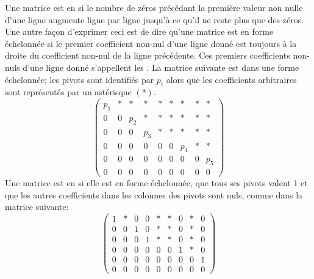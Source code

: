 Une matrice est en   si le nombre de zéros précédant la première valeur 
non nulle d'une ligne augmente ligne par ligne jusqu'à ce qu'il ne reste plus que des zéros. 
Une autre façon d'exprimer ceci est de dire qu'une matrice est en forme échelonnée si
le premier coefficient non-nul d'une ligne donné est toujours à 	la droite du coefficient non-nul de la ligne précédente.
Ces premiers coefficients non-nuls d'une ligne donné s'appellent les .
La matrice suivante est dans une forme échelonnée; les pivots sont identifiés par $p_i$ alors
que les coefficients arbitraires sont représentés par un astérisque $(*)$.
\[
\begin{pmatrix}
p_1 & *  & * & * & * & * & * & * & * \\
0 & 0 & p_2 & * & * & * & * & * & * \\
0 & 0 & 0 & p_3 & * & * & * & * & * \\ 
0 & 0 & 0 & 0 & 0 & 0 & p_4 & * & * \\ 
0 & 0 & 0 & 0 & 0 & 0 & 0 & 0 & p_5 \\ 
0 & 0 & 0 & 0 & 0 & 0 & 0 & 0 & 0 
\end{pmatrix}
\]
Une matrice est en  si elle est en forme échelonnée,
que tous ses pivots valent 1 et que les autres coefficients dans les colonnes des
pivots sont nuls, comme dans la matrice suivante:
\[
\begin{pmatrix}
1 & * & 0 & 0 & * & * & 0 & * & 0  \\
0 & 0 & 1 & 0 & * & * & 0 & * & 0  \\
0 & 0 & 0 & 1 & * & * & 0 & * & 0  \\ 
0 & 0 & 0 & 0 & 0 & 0 & 1 & * & 0  \\ 
0 & 0 & 0 & 0 & 0 & 0 & 0 & 0 & 1  \\ 
0 & 0 & 0 & 0 & 0 & 0 & 0 & 0 & 0  
\end{pmatrix}
\]

